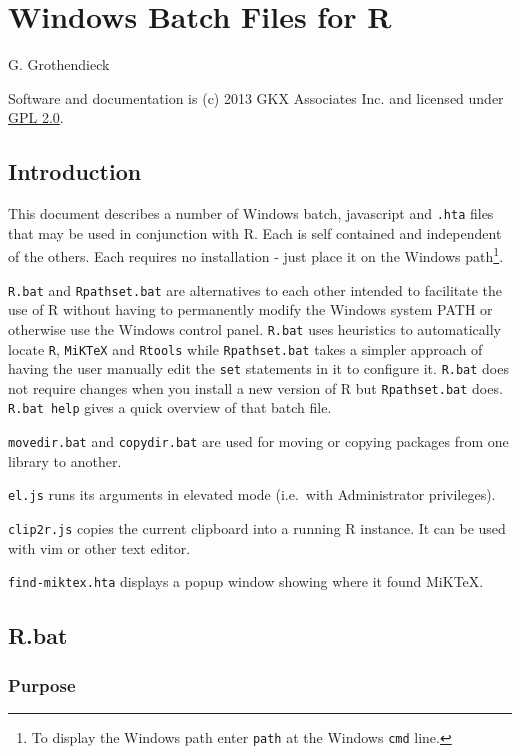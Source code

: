\section{Windows Batch Files for R}

G. Grothendieck

Software and documentation is (c) 2013 GKX Associates Inc. and licensed
under \href{http://www.gnu.org/licenses/gpl-2.0.html}{GPL 2.0}.

\subsection{Introduction}

This document describes a number of Windows batch, javascript and
\texttt{.hta} files that may be used in conjunction with R. Each is self
contained and independent of the others. Each requires no installation -
just place it on the Windows path\footnote{To display the Windows path
  enter \texttt{path} at the Windows \texttt{cmd} line.}.

\texttt{R.bat} and \texttt{Rpathset.bat} are alternatives to each other
intended to facilitate the use of R without having to permanently modify
the Windows system PATH or otherwise use the Windows control panel.
\texttt{R.bat} uses heuristics to automatically locate \texttt{R},
\texttt{MiKTeX} and \texttt{Rtools} while \texttt{Rpathset.bat} takes a
simpler approach of having the user manually edit the \texttt{set}
statements in it to configure it. \texttt{R.bat} does not require
changes when you install a new version of R but \texttt{Rpathset.bat}
does. \texttt{R.bat help} gives a quick overview of that batch file.

\texttt{movedir.bat} and \texttt{copydir.bat} are used for moving or
copying packages from one library to another.

\texttt{el.js} runs its arguments in elevated mode (i.e.~with
Administrator privileges).

\texttt{clip2r.js} copies the current clipboard into a running R
instance. It can be used with vim or other text editor.

\texttt{find-miktex.hta} displays a popup window showing where it found
MiKTeX.

\subsection{R.bat}

\subsubsection{Purpose}

